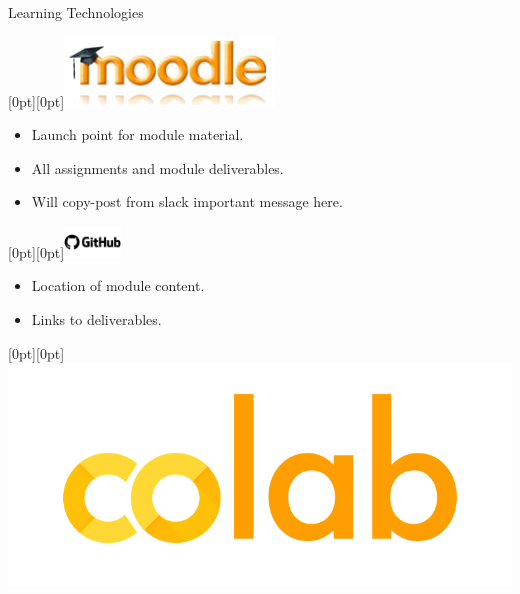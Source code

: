 \documentclass{wit-slides-2020}
\begin{document}
\begin{frame}[label=todo]{Learning Technologies}

\hfill \raisebox{6pt}[0pt][0pt]{\includegraphics[trim=0 0 0 0,scale=.3]{pic/Moodle}}

\vspace{-9pt}
\begin{itemize}
\item
Launch point for module material. 
\item 
All assignments and module deliverables.
\item
Will copy-post from slack important message here.
\end{itemize}

\vspace{6pt}
\hfill \raisebox{9pt}[0pt][0pt]{\includegraphics[trim=0 0 0 0,width=1.5cm]{pic/Github}}

\vspace{-9pt}
\begin{itemize}
\item
Location of module content.
\item
Links to deliverables.
\end{itemize}

\vspace{6pt}
\hfill \raisebox{6pt}[0pt][0pt]{\includegraphics[trim=0 0 0 0,scale=.06]{pic/colab}}


\end{frame}
\end{document}
